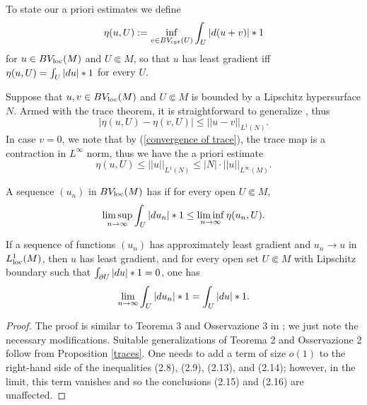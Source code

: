 To state our a priori estimates we define
$$\eta(u, U) := \inf_{v \in BV_{\mathrm{cpt}}(U)} \int_U |d(u+v)| *1$$
for $u \in BV_{\mathrm{loc}}(M)$ and $U \Subset M$, so that $u$ has least gradient iff $\eta(u, U) = \int_U |du| *1$ for every $U$.

Suppose that $u, v \in BV_{\mathrm{loc}}(M)$ and $U \Subset M$ is bounded by a Lipschitz hypersurface $N$. Armed with the trace theorem, it is straightforward to generalize \cite[Lemma 5.6]{Giusti77}, thus
\begin{equation}
|\eta(u, U) - \eta(v, U)| \leq ||u - v||_{L^1(N)}. \label{a priori estimate 1}
\end{equation}
In case $v = 0$, we note that by (\ref{convergence of trace}), the trace map is a contraction in $L^\infty$ norm, thus we have the a priori estimate
\begin{equation}
\eta(u, U) \leq ||u||_{L^1(N)} \leq |N| \cdot ||u||_{L^\infty(M)}. \label{a priori estimate 2}
\end{equation}

\begin{definition}
A sequence $(u_n)$ in $BV_{\mathrm{loc}}(M)$ has  if for every open $U \Subset M$,
$$\limsup_{n \to \infty} \int_U |du_n| *1 \leq \liminf_{n \to \infty} \eta(u_n, U).$$
\end{definition}

\begin{proposition}\label{Miranda convergence}
If a sequence of functions $(u_n)$ has approximately least gradient and $u_n \to u$ in $L^1_{\mathrm{loc}}(M)$, then $u$ has least gradient, and for every open set $U \Subset M$ with Lipschitz boundary such that $\int_{\partial U} |du|*1 = 0$, one has
\begin{equation}\label{convergence in total variation}
\lim_{n \to \infty} \int_U |du_n|*1 = \int_U |du| *1.
\end{equation}
\end{proposition}
\begin{proof}
The proof is similar to Teorema 3 and Osservazione 3 in \cite{Miranda67}; we just note the necessary modifications.
Suitable generalizations of Teorema 2 and Osservazione 2 follow from Proposition \ref{traces}.
One needs to add a term of size $o(1)$ to the right-hand side of the inequalities (2.8), (2.9), (2.13), and (2.14); however, in the limit, this term vanishes and so the conclusions (2.15) and (2.16) are unaffected.
\end{proof}

